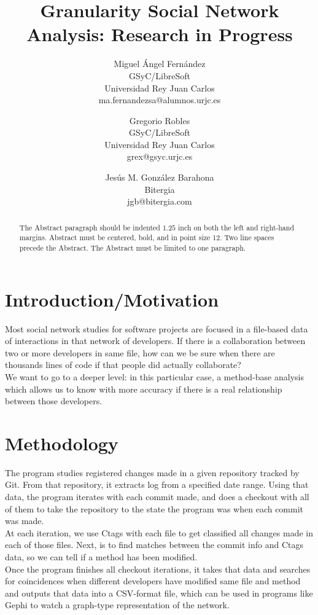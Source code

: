 \documentclass[a4paper]{article}
\title{Granularity Social Network Analysis: Research in Progress}
\author{
Miguel Ángel Fernández \\ GSyC/LibreSoft \\
                Universidad Rey Juan Carlos \\ ma.fernandezsa@alumnos.urjc.es
\and
Gregorio Robles \\ GSyC/LibreSoft \\
                Universidad Rey Juan Carlos \\ grex@gsyc.urjc.es
\and
Jesús M. González Barahona \\ Bitergia \\
                jgb@bitergia.com
}
\begin{document}
\maketitle

\begin{abstract}
The Abstract paragraph should be indented $1.25$ inch on both
the left and right-hand margins. Abstract must be centered, bold, and
in point size 12. Two line spaces precede the Abstract. The Abstract
must be limited to one paragraph.
\end{abstract}
\vskip 32pt


\section{Introduction/Motivation}

Most social network studies for software projects are focused in a file-based data of interactions in that network of developers. If there is a collaboration between two or more developers in same file, how can we be sure when there are thousands lines of code if that people did actually collaborate? \\
We want to go to a deeper level: in this particular case, a method-base analysis which allows us to know with more accuracy if there is a real relationship between those developers.

\section{Methodology}

The program studies registered changes made in a given repository tracked by Git. From that repository, it extracts log from a specified date range. Using that data, the program iterates with each commit made, and does a checkout with all of them to take the repository to the state the program was when each commit was made. \\ At each iteration, we use Ctags with each file to get classified all changes made in each of those files. Next, is to find matches between the commit info and Ctags data, so we can tell if a method has been modified.\\
Once the program finishes all checkout iterations, it takes that data and searches for coincidences when different developers have modified same file and method and outputs that data into a CSV-format file, which can be used in programs like Gephi to watch a graph-type representation of the network.
\end{document}

